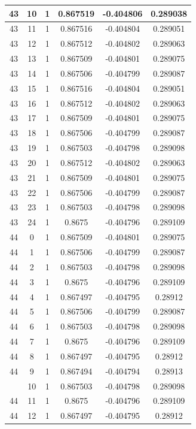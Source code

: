 \documentclass[12pt,a4paper]{article}
\numberwithin{equation}{section}
\numberwithin{figure}{section}
\numberwithin{table}{section}
\begin{document}
\begin{longtable}{|c|c|c|c|c|c|}
43 & 10 & 1 & 0.867519 & -0.404806 & 0.289038 \\ \hline
43 & 11 & 1 & 0.867516 & -0.404804 & 0.289051 \\ \hline
43 & 12 & 1 & 0.867512 & -0.404802 & 0.289063 \\ \hline
43 & 13 & 1 & 0.867509 & -0.404801 & 0.289075 \\ \hline
43 & 14 & 1 & 0.867506 & -0.404799 & 0.289087 \\ \hline
43 & 15 & 1 & 0.867516 & -0.404804 & 0.289051 \\ \hline
43 & 16 & 1 & 0.867512 & -0.404802 & 0.289063 \\ \hline
43 & 17 & 1 & 0.867509 & -0.404801 & 0.289075 \\ \hline
43 & 18 & 1 & 0.867506 & -0.404799 & 0.289087 \\ \hline
43 & 19 & 1 & 0.867503 & -0.404798 & 0.289098 \\ \hline
43 & 20 & 1 & 0.867512 & -0.404802 & 0.289063 \\ \hline
43 & 21 & 1 & 0.867509 & -0.404801 & 0.289075 \\ \hline
43 & 22 & 1 & 0.867506 & -0.404799 & 0.289087 \\ \hline
43 & 23 & 1 & 0.867503 & -0.404798 & 0.289098 \\ \hline
43 & 24 & 1 & 0.8675 & -0.404796 & 0.289109 \\ \hline
44 & 0 & 1 & 0.867509 & -0.404801 & 0.289075 \\ \hline
44 & 1 & 1 & 0.867506 & -0.404799 & 0.289087 \\ \hline
44 & 2 & 1 & 0.867503 & -0.404798 & 0.289098 \\ \hline
44 & 3 & 1 & 0.8675 & -0.404796 & 0.289109 \\ \hline
44 & 4 & 1 & 0.867497 & -0.404795 & 0.28912 \\ \hline
44 & 5 & 1 & 0.867506 & -0.404799 & 0.289087 \\ \hline
44 & 6 & 1 & 0.867503 & -0.404798 & 0.289098 \\ \hline
44 & 7 & 1 & 0.8675 & -0.404796 & 0.289109 \\ \hline
44 & 8 & 1 & 0.867497 & -0.404795 & 0.28912 \\ \hline
44 & 9 & 1 & 0.867494 & -0.404794 & 0.28913 \\ \hline
\pagebreak
44 & 10 & 1 & 0.867503 & -0.404798 & 0.289098 \\ \hline
44 & 11 & 1 & 0.8675 & -0.404796 & 0.289109 \\ \hline
44 & 12 & 1 & 0.867497 & -0.404795 & 0.28912 \\ \hline

\end{longtable}
\end{document}
